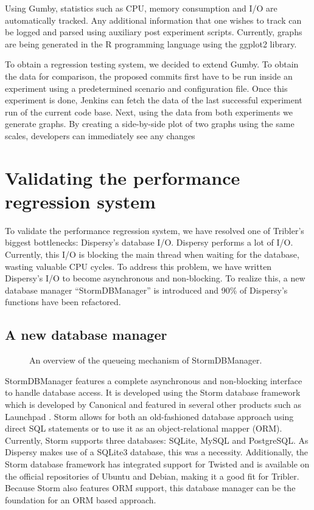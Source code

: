 Using Gumby, statistics such as CPU, memory consumption and I/O are automatically tracked.
Any additional information that one wishes to track can be logged and parsed using auxiliary post experiment scripts.
Currently, graphs are being generated in the R programming language using the ggplot2 library.

To obtain a regression testing system, we decided to extend Gumby.
To obtain the data for comparison, the proposed commits first have to be run inside an experiment using a predetermined scenario and configuration file.
Once this experiment is done, Jenkins can fetch the data of the last successful experiment run of the current code base.
Next, using the data from both experiments we generate graphs.
By creating a side-by-side plot of two graphs using the same scales, developers can immediately see any changes 

\section{Validating the performance regression system}

To validate the performance regression system, we have resolved one of Tribler's biggest bottlenecks: Dispersy's database I/O.
Dispersy performs a lot of I/O.
Currently, this I/O is blocking the main thread when waiting for the database, wasting valuable CPU cycles.
To address this problem, we have written Dispersy's I/O to become asynchronous and non-blocking.
To realize this, a new database manager \enquote{StormDBManager} is introduced and 90\% of Dispersy's functions have been refactored.

\subsection{A new database manager}

\begin{figure}[t!]
	\caption{An overview of the queueing mechanism of StormDBManager.}
	\label{fig:storm_db_worker}
\end{figure}

StormDBManager features a complete asynchronous and non-blocking interface to handle database access.
It is developed using the Storm database framework which is developed by Canonical and featured in several other products such as Launchpad \cite{canonical2011storm}.
Storm allows for both an old-fashioned database approach using direct SQL statements or to use it as an object-relational mapper (ORM).
Currently, Storm supports three databases: SQLite, MySQL and PostgreSQL.
As Dispersy makes use of a SQLite3 database, this was a necessity.
Additionally, the Storm database framework has integrated support for Twisted and is available on the official repositories of Ubuntu and Debian, making it a good fit for Tribler.
Because Storm also features ORM support, this database manager can be the foundation for an ORM based approach.

